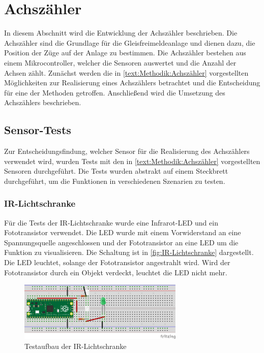 \section{Achszähler}\label{text:Entwicklung-der-GFA:Achszähler}

In diesem Abschnitt wird die Entwicklung der Achszähler beschrieben. Die Achszähler sind die Grundlage für die Gleisfreimeldeanlage und dienen dazu, die Position der Züge auf der Anlage zu bestimmen. Die Achszähler bestehen aus einem Mikrocontroller, welcher die Sensoren auswertet und die Anzahl der Achsen zählt. Zunächst werden die in \autoref{text:Methodik:Achszähler} vorgestellten Möglichkeiten zur Realisierung eines Achszählers betrachtet und die Entscheidung für eine der Methoden getroffen. Anschließend wird die Umsetzung des Achszählers beschrieben.

\subsection{Sensor-Tests}\label{text:Entwicklung-der-GFA:Achszähler:Sensor-Tests}

Zur Entscheidungsfindung, welcher Sensor für die Realisierung des Achszählers verwendet wird, wurden Tests mit den in \autoref{text:Methodik:Achszähler} vorgestellten Sensoren durchgeführt. Die Tests wurden abstrakt auf einem Steckbrett durchgeführt, um die Funktionen in verschiedenen Szenarien zu testen.

\subsubsection{IR-Lichtschranke}\label{text:Entwicklung-der-GFA:Achszähler:Sensor-Tests:Lichtschranke}

Für die Tests der IR-Lichtschranke wurde eine Infrarot-LED und ein Fototransistor verwendet. Die LED wurde mit einem Vorwiderstand an eine Spannungsquelle angeschlossen und der Fototransistor an eine LED um die Funktion zu visualisieren. Die Schaltung ist in \autoref{fig:IR-Lichtschranke} dargestellt. Die LED leuchtet, solange der Fototransistor angestrahlt wird. Wird der Fototransistor durch ein Objekt verdeckt, leuchtet die LED nicht mehr. 

\begin{figure}[H]
    \centering
    \includegraphics[width=0.7\textwidth]{Assets/Images/4-Entwicklung-der-GFA/IR-Test_bb.png}
    \caption{Testaufbau der IR-Lichtschranke}\label{fig:IR-Lichtschranke}
\end{figure}

